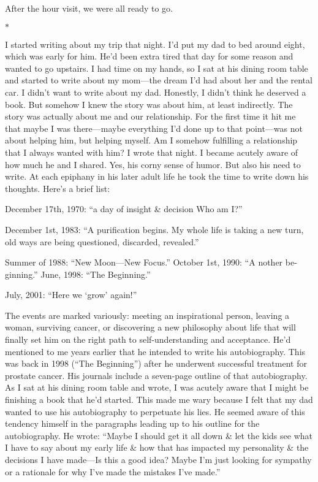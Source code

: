 \documentclass[12pt]{book}
\begin{document}
After the hour visit, we were all ready to go.

\begin{center}$*$\end{center}

I started writing about my trip that night. I'd put my dad to bed around eight, which was early for him. He'd been extra tired that day for some reason and wanted to go upstairs. I had time on my hands, so I sat at his dining room table and started to write about my mom---the dream I'd had about her and the rental car. I didn't want to write about my dad. Honestly, I didn't think he deserved a book. But somehow I knew the story was about him, at least indirectly. The story was actually about me and our relationship. For the first time it hit me that maybe I was there---maybe everything I'd done up to that point---was not about helping him, but helping myself. Am I somehow fulfilling a relationship that I always wanted with him? I wrote that night. I became acutely aware of how much he and I shared. Yes, his corny sense of humor. But also his need to write. At each epiphany in his later adult life he took the time to write down his thoughts. Here's a brief list:

December 17th, 1970: ``a day of insight \& decision Who am I?''

December 1st, 1983: ``A purification begins. My whole life is taking a new turn, old ways are being questioned, discarded, revealed.''

Summer of 1988: ``New Moon---New Focus.'' October 1st, 1990: ``A nother be-ginning.'' June, 1998: ``The Beginning.''

July, 2001: ``Here we `grow' again!''

The events are marked variously: meeting an inspirational person, leaving a woman, surviving cancer, or discovering a new philosophy about life that will finally set him on the right path to self-understanding and acceptance. He'd mentioned to me years earlier that he intended to write his autobiography. This was back in 1998 (``The Beginning'') after he underwent successful treatment for prostate cancer. His journals include a seven-page outline of that autobiography. As I sat at his dining room table and wrote, I was acutely aware that I might be finishing a book that he'd started. This made me wary because I felt that my dad wanted to use his autobiography to perpetuate his lies. He seemed aware of this tendency himself in the paragraphs leading up to his outline for the autobiography. He wrote: ``Maybe I should get it all down \& let the kids see what I have to say about my early life \& how that has impacted my personality \& the decisions I have made---Is this a good idea? Maybe I'm just looking for sympathy or a rationale for why I've made the mistakes I've made.''
\end{document}

